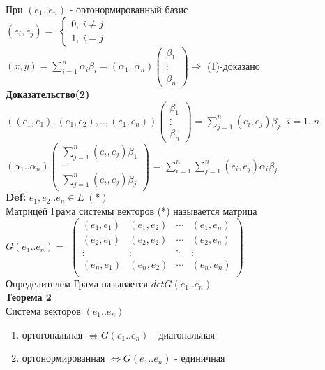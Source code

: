 При $(e_1..e_n)$ - ортонормированный базис \\
$(e_i,e_j)=$
$\left\{ \begin{matrix}
\mbox{$0, \ i \ne j $} \\
\mbox{$1, \ i=j$}
\end{matrix}\right.$ \\
$(x,y)=\sum \limits_{i=1}^n {\alpha_i \beta_i} = (\alpha_1..\alpha_n) \begin{pmatrix} \beta_1 \\ \vdots \\ \beta_n \end{pmatrix} \Rightarrow$ (1)-доказано\\
\textbf{Доказательство(2)} \\
$((e_1,e_1),(e_1,e_2),..,(e_1,e_n)) \begin{pmatrix} \beta_1 \\ \vdots \\ \beta_n \end{pmatrix} = \sum \limits_{j=1}^n {(e_i,e_j) \beta_j}, \ i=1..n $ \\
$(\alpha_1..\alpha_n) \begin{pmatrix} \sum \limits_{j=1}^n {(e_i,e_j)\beta_1} \\ \cdots \\ \sum \limits_{j=1}^n {(e_i,e_j)\beta_j} \end{pmatrix}$ = 
$\sum \limits_{i=1}^n \sum \limits_{j=1}^n {(e_i,e_j)\alpha_i \beta_j} $ \\
\textbf{Def: } $e_1,e_2..e_n \in E\ (*)$ \\
Матрицей Грама системы векторов (*) называется матрица \\ $G(e_1..e_n)=$ 
       $\begin{pmatrix}
         (e_1,e_1) & (e_1,e_2) & \cdots & (e_1,e_n) \\
         (e_2,e_1) & (e_2,e_2) & \cdots & (e_2,e_n) \\
         \vdots & \vdots & \ddots & \vdots \\
         (e_n,e_1) & (e_n,e_2) & \cdots & (e_n,e_n) \\
        \end{pmatrix}$ \\
Определителем Грама называется $detG(e_1..e_n)$\\
\textbf{Теорема 2} \\
Система векторов $(e_1..e_n)$ 
\begin{enumerate}
 \item ортогональная $\Leftrightarrow G(e_1..e_n)$ - диагональная 
 \item ортонормированная $\Leftrightarrow G(e_1..e_n)$ - единичная 
\end{enumerate}
